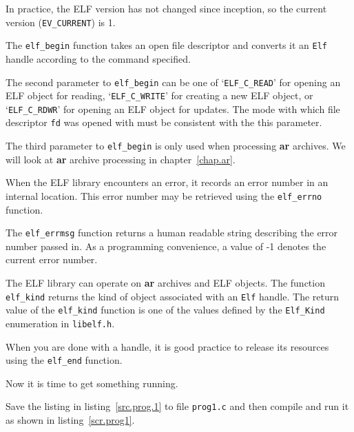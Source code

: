 \documentclass[a4paper,pdftex]{book}
\makeatletter
\newcommand{\constant}[1]{\texttt{#1}}
\newcommand{\function}[1]{\texttt{#1}}
\newcommand{\filename}[1]{\texttt{#1}}
\newcommand{\library}[1]{\texttt{#1}}
\newcommand{\parameter}[1]{\texttt{#1}}
\newcommand{\tool}[1]{\textbf{#1}}
\newcommand{\type}[1]{\texttt{#1}}
\newenvironment{callout}[2][black]{%
  \begingroup\newcommand{\@cocolor}{#1}%
  \setlength{\shadowsize}{1.2pt}%
  \newcommand{\@cogroup}[1]{#2}}{\endgroup}
\newcommand{\@co}[1]{\shadowbox{\color{\@cocolor}#1}}
\newcommand{\coref}[1]{%
  \hypertarget{\@cogroup.#1.cr}{%
    \hyperlink{\@cogroup.#1.co}{\@co{#1}}}}
\makeatother
\begin{document}
\begin{callout}{prog1}
\begin{description}
    In practice, the ELF version has not changed since inception, so
    the current version (\constant{EV\_CURRENT}) is 1.

  \item[\coref{5}] The \function{elf\_begin} function takes an open file
    descriptor and converts it an \type{Elf} handle according to the
    command specified.

    The second parameter to \function{elf\_begin} can be one of
    `\constant{ELF\_C\_READ}' for opening an ELF object for reading,
    `\constant{ELF\_C\_WRITE}' for creating a new ELF object, or
    `\constant{ELF\_C\_RDWR}' for opening an ELF object for updates.
    The mode with which file descriptor \parameter{fd} was opened with
    must be consistent with the this parameter.

    The third parameter to \function{elf\_begin} is only used when
    processing \tool{ar} ar\-chives.  We will look at \tool{ar}
    archive processing in chapter~\vref{chap.ar}.

  \item[\coref{6}] When the ELF library encounters an error, it records
    an error number in an internal location.  This error number may be
    retrieved using the \function{elf\_errno} function.

    The \function{elf\_errmsg} function returns a human readable
    string describing the error number passed in.  As a programming
    convenience, a value of -1 denotes the current error number.

  \item[\coref{3} \coref{7}] The ELF library can operate on \tool{ar}
    archives and ELF objects.  The function \function{elf\_kind}
    returns the kind of object associated with an \type{Elf} handle.
    The return value of the \function{elf\_kind} function is one of
    the values defined by the \type{Elf\_Kind} enumeration in
    \filename{libelf.h}.

  \item[\coref{8}] When you are done with a handle, it is good practice
    to release its resources using the \function{elf\_end} function.
  \end{description}
\end{callout}

Now it is time to get something running.

Save the listing in listing~\vref{src.prog.1} to file
\filename{prog1.c} and then compile and run it as shown in
listing~\vref{scr.prog1}.%
\index{libelf@\library{libelf}!linking with}
\end{document}
